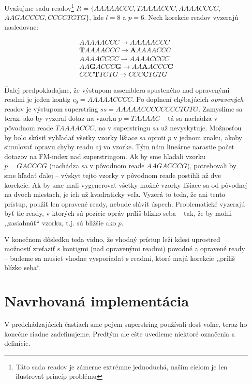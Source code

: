 \begin{example}
Uvažujme sadu readov\footnote{Táto sada readov je zámerne extrémne jednoduchá, našim cieľom je len ilustrovať princíp problému} $R=\{AAAAACCC, TAAAACCC, AAAACCCC,$ \\ $ AAGACCCG, CCCCTGTG\}$, kde $l=8$ a $p=6$. Nech korekcie readov vyzerajú nasledovne:

\begin{align*}
AAAAACCC \rightarrow AAAAACCC \\
\mathbf{T}AAAACCC \rightarrow \mathbf{A}AAAACCC \\
AAAACCCC \rightarrow AAAACCCC \\
AA \mathbf{G} ACCC \mathbf{G} \rightarrow AA \mathbf{A} ACCC \mathbf{C} \\
CCC \mathbf{T} TGTG \rightarrow CCC \mathbf{C} TGTG
\end{align*}

Ďalej predpokladajme, že výstupom assemblera spusteného nad opravenými readmi je jeden kontig $c_0=AAAAACCCC$. Po doplnení chýbajúcich \emph{opravených} readov je výstupom superstring $ss=AAAAACCCCCCCCTGTG$. Zamyslime sa teraz, ako by vyzeral dotaz na vzorku $p=TAAAAC$ -- tá sa nachádza v pôvodnom reade $TAAAACCC$, no v superstringu sa už nevyskytuje. Možnosťou by bolo skúsiť vyhľadať všetky vzorky líšiace sa oproti $p$ v jednom znaku, akoby simulovať opravu chyby readu aj vo vzorke. Tým nám lineárne narastie počet dotazov na FM-index nad superstringom. Ak by sme hľadali vzorku $p=GACCCG$ (nachádza sa v pôvodnom reade $AAGACCCG$), potrebovali by sme hľadať ďalej -- výskyt tejto vzorky v pôvodnom reade postihli až dve korekcie. Ak by sme mali vygenerovať všetky možné vzorky líšiace sa od pôvodnej na dvoch miestach, je ich už kvadraticky veľa. Vyzerá to teda, že ani tento prístup, použiť len opravené ready, nebude sláviť úspech. Problematické vyzerajú byť tie ready, v ktorých sú pozície opráv príliš blízko seba -- tak, že by mohli ,,zasiahnúť`` vzorku, t.j. sú bližšie ako $p$.
\end{example}

V konečnom dôsledku teda vidno, že vhodný prístup leží kdesi uprostred možností zreťaziť s kontigmi (nad opravenými readmi) povodné a opravené ready -- budeme sa musieť vhodne vysporiadať s readmi, ktoré majú korekcie ,,príliš blízko seba``.

\section{Navrhovaná implementácia}
V predchádzajúcich častiach sme pojem superstring používali dosť voľne, teraz ho konečne riadne zadefinujeme. Predtým ale ešte uvedieme niektoré označenia a definície.

